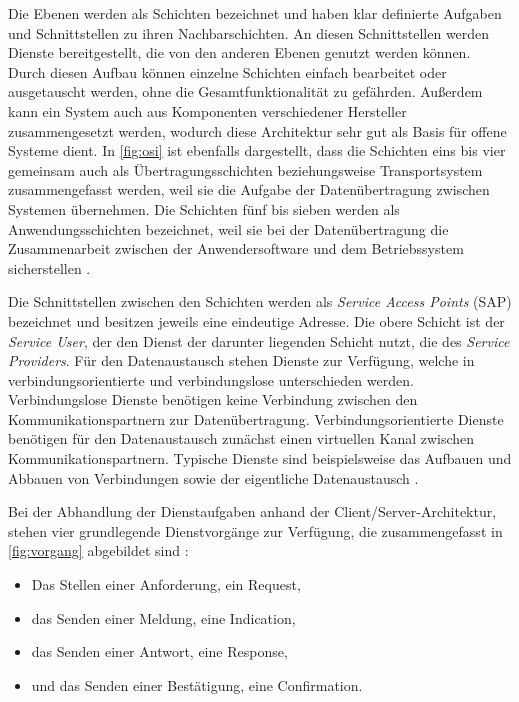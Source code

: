 Die Ebenen werden als Schichten bezeichnet und haben klar definierte Aufgaben und Schnittstellen zu ihren Nachbarschichten. An diesen Schnittstellen werden Dienste bereitgestellt, die von den anderen Ebenen genutzt werden können. Durch diesen Aufbau können einzelne Schichten einfach bearbeitet oder ausgetauscht werden, ohne die Gesamtfunktionalität zu gefährden. Außerdem kann ein System auch aus Komponenten verschiedener Hersteller zusammengesetzt werden, wodurch diese Architektur sehr gut als Basis für offene Systeme dient. In \ref{fig:osi} ist ebenfalls dargestellt, dass die Schichten eins bis vier gemeinsam auch als Übertragungsschichten beziehungsweise Transportsystem zusammengefasst werden, weil sie die Aufgabe der Datenübertragung zwischen Systemen übernehmen. Die Schichten fünf bis sieben werden als Anwendungsschichten bezeichnet, weil sie bei der Datenübertragung die Zusammenarbeit zwischen der Anwendersoftware und dem Betriebssystem sicherstellen \cite[S.~8f.]{schn06}.

Die Schnittstellen zwischen den Schichten werden als\textit{ Service Access Points} (SAP) bezeichnet und besitzen jeweils eine eindeutige Adresse. Die obere Schicht ist der \textit{Service User}, der den Dienst der darunter liegenden Schicht nutzt, die des \textit{Service Providers}. Für den Datenaustausch stehen Dienste zur Verfügung, welche in verbindungsorientierte und verbindungslose unterschieden werden. Verbindungslose Dienste benötigen keine Verbindung zwischen den Kommunikationspartnern zur Datenübertragung. Verbindungsorientierte Dienste benötigen für den Datenaustausch zunächst einen virtuellen Kanal zwischen Kommunikationspartnern. Typische Dienste sind beispielsweise das Aufbauen und Abbauen von Verbindungen sowie der eigentliche Datenaustausch \cite[S.~11f.]{schn06}.

Bei der Abhandlung der Dienstaufgaben anhand der Client/Server-Architektur, stehen vier grundlegende Dienstvorgänge zur Verfügung, die zusammengefasst in \ref{fig:vorgang} abgebildet sind \cite[S.~2f.]{mod06tcp}:

\begin{itemize}
	\item Das Stellen einer Anforderung, ein Request,
	\item das Senden einer Meldung, eine Indication,
	\item das Senden einer Antwort, eine Response,
	\item und das Senden einer Bestätigung, eine Confirmation.
\end{itemize}

